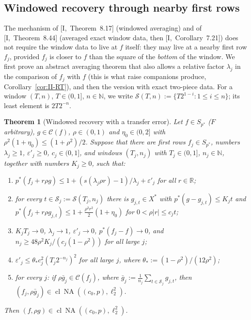 \documentclass[10pt]{amsart}
\newtheorem{theorem}{Theorem}[section]
\theoremstyle{definition}
\theoremstyle{remark}
\newcommand{\NA}{\operatorname{NA}}
\newcommand{\R}{\mathbb R}
\newcommand{\N}{\mathbb N}
\newcommand{\Cset}{\mathcal C}
\newcommand{\cl}{\operatorname{cl}}
\begin{document}
\subsection{Windowed recovery through nearby first rows}\label{subsec:II-E}

The mechanism of [I,~Theorem~8.17] (windowed averaging) and of
[I,~Theorem~8.44] (averaged exact window data, then [I,~Corollary~7.21])
does not require the window data to live at $f$ itself: they may live at a
nearby first row $f_j$, provided $f_j$ is closer to $f$ than the square of
the \emph{bottom} of the window.  We first prove an abstract averaging
theorem that also allows a relative factor $\lambda_j$ in the comparison
of $f_j$ with $f$ (this is what raise companions produce,
Corollary~\ref{cor:II-RT}), and then the version with exact two-piece data.
For a window $(T,n)$, $T\in(0,1]$, $n\in\N$, we write $\mathcal S(T,n):=
\{T2^{1-i}:1\le i\le n\}$; its least element is $2T2^{-n}$.

\begin{theorem}[Windowed recovery with a transfer error]\label{thm:II-ERT}
Let $f\in S_{p^*}$ \textup{(}$F$ arbitrary\textup{)}, $g\in\Cset(f)$,
$\rho\in(0,1)$ and $\eta_0\in(0,2]$ with $\rho^2(1+\eta_0)\le(1+\rho^2)/2$.
Suppose that there are first rows $f_j\in S_{p^*}$, numbers $\lambda_j\ge1$,
$\varepsilon'_j\ge0$, $c_j\in(0,1]$, and windows $(T_j,n_j)$ with $T_j\in(0,1]$,
$n_j\in\N$, together with numbers $K_j\ge0$, such that:
\begin{enumerate}
\item[(a)] $p^*(f_j+r\rho g)\le1+(s(\lambda_j\rho r)-1)/\lambda_j+
\varepsilon'_j$ for all $r\in\R$;
\item[(b)] for every $t\in\mathcal S_j:=\mathcal S(T_j,n_j)$ there is
$g_{j,t}\in X^*$ with $p^*(g-g_{j,t})\le K_jt$ and $p^*(f_j+r\rho g_{j,t})\le
1+\frac{\rho^2r^2}2(1+\eta_0)$ for $0<\rho|r|\le c_jt$;
\item[(c)] $K_jT_j\to0$, $\lambda_j\to1$, $\varepsilon'_j\to0$,
$p^*(f_j-f)\to0$, and $n_j\ge48\rho^2K_j/(c_j(1-\rho^2))$ for all large $j$;
\item[(d)] $\varepsilon'_j\le\theta_*c_j^2(T_j2^{-n_j})^2$ for all large $j$,
where $\theta_*:=(1-\rho^2)/(12\rho^2)$;
\item[(e)] for every $j$: if $\rho\bar g_j\in\Cset(f_j)$, where $\bar
g_j:=\frac1{n_j}\sum_{t\in\mathcal S_j}g_{j,t}$, then $(f_j,\rho\bar g_j)\in
\cl\NA((c_0,p),\ell_2^2)$.
\end{enumerate}
Then $(f,\rho g)\in\cl\NA((c_0,p),\ell_2^2)$.
\end{theorem}
\end{document}
